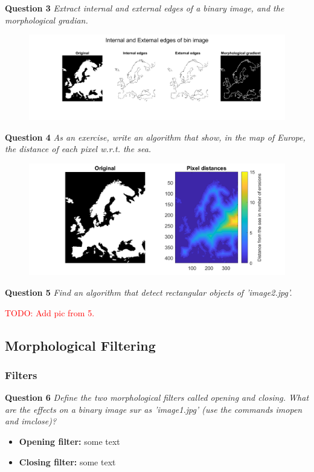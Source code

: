 \newpage
\textbf{Question 3} \textit{Extract internal and external edges of a binary image, and the morphological gradian.}
\begin{figure}[h]
    \centering
    \includegraphics[width=1\linewidth]{Doc/Graphics/Part2_Question3.png}
\end{figure}


\textbf{Question 4} \textit{As an exercise, write an algorithm that show, in the map of Europe, the distance of each pixel w.r.t. the sea.}
\begin{figure}[h]
    \centering
    \includegraphics[width=0.75\linewidth]{Doc/Graphics/part2_Question4.png}
\end{figure}

\textbf{Question 5} \textit{Find an algorithm that detect rectangular objects of ’image2.jpg’.}

\textcolor{red}{TODO: Add pic from 5.}


\subsection{Morphological Filtering}
\subsubsection{Filters}
\textbf{Question 6} \textit{Deﬁne the two morphological ﬁlters called opening and closing. What are the eﬀects on a binary image sur as ’image1.jpg’ (use the commands imopen and imclose)?}

\begin{itemize}
    \item \textbf{Opening filter:}
    some text

    \item  \textbf{Closing filter:}
    some text
\end{itemize}

